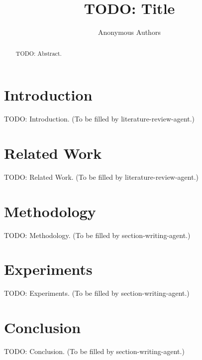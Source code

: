 \documentclass{article}
\title{TODO: Title}
\author{Anonymous Authors}
\date{}
\begin{document}
\maketitle

\begin{abstract}
TODO: Abstract.
\end{abstract}

\section{Introduction}
TODO: Introduction. (To be filled by literature-review-agent.)

\section{Related Work}
TODO: Related Work. (To be filled by literature-review-agent.)

\section{Methodology}
TODO: Methodology. (To be filled by section-writing-agent.)

\section{Experiments}
TODO: Experiments. (To be filled by section-writing-agent.)

\section{Conclusion}
TODO: Conclusion. (To be filled by section-writing-agent.)



\end{document}
